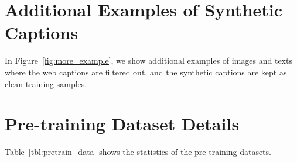 \vspace{-0.5ex}
\section{Additional Examples of Synthetic Captions}
In Figure~\ref{fig:more_example},
we show additional examples of images and texts where the web captions are filtered out, and the synthetic captions are kept as clean training samples.



\section{Pre-training Dataset Details}

Table~\ref{tbl:pretrain_data} shows the statistics of the pre-training datasets.
\begin{table}[!h]
	\small
	\centering	
	\setlength\tabcolsep{4pt}
	\vspace{-2ex}	
	\caption
	{
		\small	
		Statistics of the pre-training datasets.
	}
	\label{tbl:pretrain_data}
	\vspace{-1ex}	
\end{table}